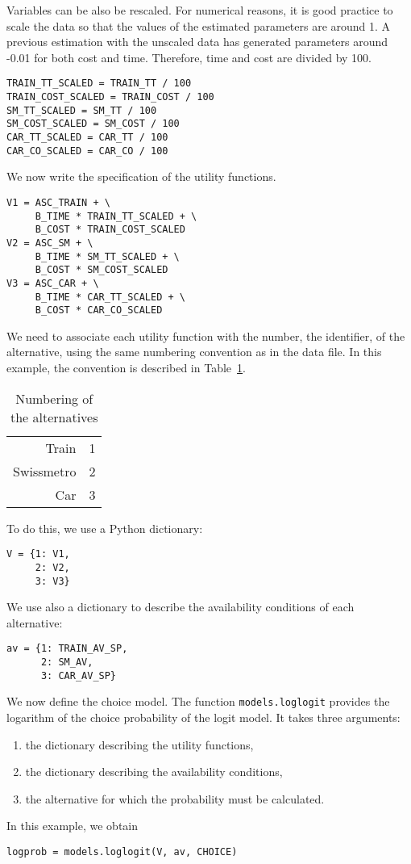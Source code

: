 \documentclass[12pt,a4paper]{article}
\begin{document}
Variables can be also be rescaled. For numerical reasons, it is good
practice to scale the data so that the values of the estimated parameters are around 1. A previous estimation with the unscaled data has generated
parameters around -0.01 for both cost and time. Therefore, 
time and cost are divided by 100.

\begin{lstlisting}[style=nonumbers]
TRAIN_TT_SCALED = TRAIN_TT / 100
TRAIN_COST_SCALED = TRAIN_COST / 100
SM_TT_SCALED = SM_TT / 100
SM_COST_SCALED = SM_COST / 100
CAR_TT_SCALED = CAR_TT / 100
CAR_CO_SCALED = CAR_CO / 100
\end{lstlisting}

We now write the specification of the
utility functions. 

\begin{lstlisting}[style=nonumbers]
V1 = ASC_TRAIN + \
     B_TIME * TRAIN_TT_SCALED + \
     B_COST * TRAIN_COST_SCALED
V2 = ASC_SM + \
     B_TIME * SM_TT_SCALED + \
     B_COST * SM_COST_SCALED
V3 = ASC_CAR + \
     B_TIME * CAR_TT_SCALED + \
     B_COST * CAR_CO_SCALED
\end{lstlisting}

We need to associate each utility function with the number, the identifier, of the
alternative, using the same numbering convention as in the data file. In this
example, the convention is described in Table~\ref{tab:choice}.

\begin{table}[htb]
\begin{center}
\begin{tabular}{rl}
Train & 1 \\
Swissmetro & 2 \\
Car & 3
\end{tabular}
\end{center}
\caption{\label{tab:choice}Numbering of the alternatives}
\end{table}


To do
this, we use a Python dictionary:
\begin{lstlisting}[style=nonumbers]
V = {1: V1,
     2: V2,
     3: V3}
\end{lstlisting}
We use also a dictionary to describe the availability conditions of
each alternative:
\begin{lstlisting}[style=nonumbers]
av = {1: TRAIN_AV_SP,
      2: SM_AV,
      3: CAR_AV_SP}
\end{lstlisting}


We now define the choice model. The function \lstinline+models.loglogit+
provides the logarithm of the choice probability of the logit
model. It takes three arguments: 
\begin{enumerate}
\item the dictionary describing the utility functions,
\item the dictionary describing the availability conditions,
\item the alternative for which the probability must be calculated.
\end{enumerate}
In this example, we obtain
\begin{lstlisting}[style=nonumbers]
logprob = models.loglogit(V, av, CHOICE)
\end{lstlisting}
\end{document}
